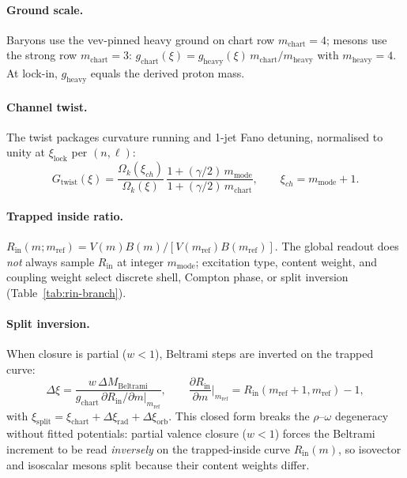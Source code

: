 \documentclass[11pt]{amsart}
\begin{document}
\paragraph{Ground scale.}
Baryons use the vev-pinned heavy ground on chart row $m_{\mathrm{chart}}=4$;
mesons use the strong row $m_{\mathrm{chart}}=3$:
$g_{\mathrm{chart}}(\xi)=g_{\mathrm{heavy}}(\xi)\,m_{\mathrm{chart}}/m_{\mathrm{heavy}}$
with $m_{\mathrm{heavy}}=4$. At lock-in, $g_{\mathrm{heavy}}$ equals the derived proton mass.

\paragraph{Channel twist.}
The twist packages curvature running and 1-jet Fano detuning, normalised to unity at
$\xi_{\mathrm{lock}}$ per $(n,\ell)$:
\[
  G_{\mathrm{twist}}(\xi)
  = \frac{\Omega_k(\xi_{ch})}{\Omega_k(\xi)}\,
    \frac{1+(\gamma/2)\,m_{\mathrm{mode}}}{1+(\gamma/2)\,m_{\mathrm{chart}}},
  \qquad \xi_{ch}=m_{\mathrm{mode}}+1.
\]

\paragraph{Trapped inside ratio.}
$R_{\mathrm{in}}(m;m_{\mathrm{ref}})=V(m)B(m)/[V(m_{\mathrm{ref}})B(m_{\mathrm{ref}})]$.
The global readout does \emph{not} always
sample $R_{\mathrm{in}}$ at integer $m_{\mathrm{mode}}$; excitation type, content weight,
and coupling weight select discrete shell, Compton phase, or split inversion (Table~\ref{tab:rin-branch}).

\paragraph{Split inversion.}
When closure is partial ($w<1$), Beltrami steps are inverted on the trapped curve:
\begin{equation}
\label{eq:split-xi}
  \Delta\xi
  = \frac{w\,\Delta M_{\mathrm{Beltrami}}}
         {g_{\mathrm{chart}}\,\partial R_{\mathrm{in}}/\partial m\big|_{m_{\mathrm{ref}}}},
  \qquad
  \frac{\partial R_{\mathrm{in}}}{\partial m}\Big|_{m_{\mathrm{ref}}}
  = R_{\mathrm{in}}(m_{\mathrm{ref}}+1,m_{\mathrm{ref}})-1,
\end{equation}
with $\xi_{\mathrm{split}}=\xi_{\mathrm{chart}}+\Delta\xi_{\mathrm{rad}}+\Delta\xi_{\mathrm{orb}}$.
This closed form breaks the $\rho$--$\omega$
degeneracy without fitted potentials: partial valence closure ($w<1$) forces the Beltrami increment to be read \emph{inversely} on the trapped-inside curve $R_{\mathrm{in}}(m)$, so isovector and isoscalar mesons split because their content weights differ.
\end{document}
